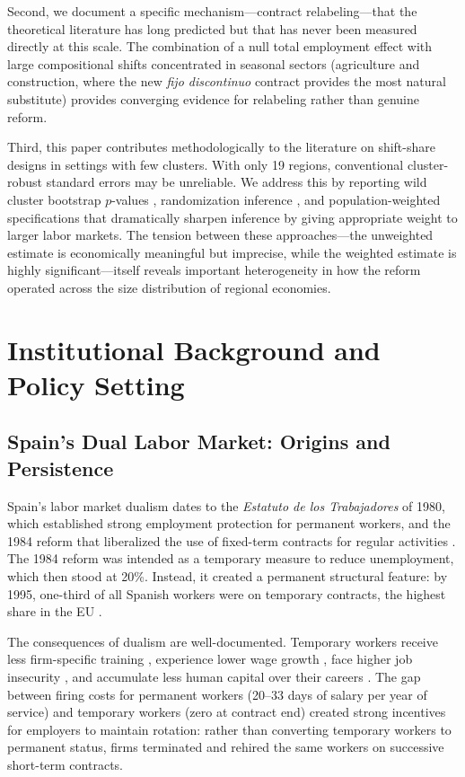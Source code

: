 \documentclass[12pt]{article}
\begin{document}
Second, we document a specific mechanism---contract relabeling---that the theoretical literature has long predicted but that has never been measured directly at this scale. The combination of a null total employment effect with large compositional shifts concentrated in seasonal sectors (agriculture and construction, where the new \emph{fijo discontinuo} contract provides the most natural substitute) provides converging evidence for relabeling rather than genuine reform.

Third, this paper contributes methodologically to the literature on shift-share designs in settings with few clusters. With only 19 regions, conventional cluster-robust standard errors may be unreliable. We address this by reporting wild cluster bootstrap $p$-values \citep{cameron2008bootstrap}, randomization inference \citep{fisher1935design}, and population-weighted specifications that dramatically sharpen inference by giving appropriate weight to larger labor markets. The tension between these approaches---the unweighted estimate is economically meaningful but imprecise, while the weighted estimate is highly significant---itself reveals important heterogeneity in how the reform operated across the size distribution of regional economies.


\section{Institutional Background and Policy Setting}
\label{sec:background}

\subsection{Spain's Dual Labor Market: Origins and Persistence}

Spain's labor market dualism dates to the \emph{Estatuto de los Trabajadores} of 1980, which established strong employment protection for permanent workers, and the 1984 reform that liberalized the use of fixed-term contracts for regular activities \citep{dolado2002drawing}. The 1984 reform was intended as a temporary measure to reduce unemployment, which then stood at 20\%. Instead, it created a permanent structural feature: by 1995, one-third of all Spanish workers were on temporary contracts, the highest share in the EU \citep{bentolila2019got}.

The consequences of dualism are well-documented. Temporary workers receive less firm-specific training \citep{albert2005education}, experience lower wage growth \citep{de2002role}, face higher job insecurity \citep{dolado2002drawing}, and accumulate less human capital over their careers \citep{garcia2010returns}. The gap between firing costs for permanent workers (20--33 days of salary per year of service) and temporary workers (zero at contract end) created strong incentives for employers to maintain rotation: rather than converting temporary workers to permanent status, firms terminated and rehired the same workers on successive short-term contracts.
\end{document}
